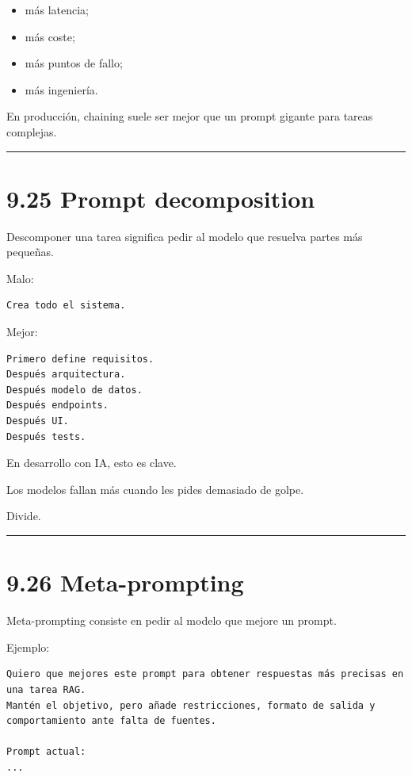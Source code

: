 \begin{itemize}
\tightlist
\item
  más latencia;
\item
  más coste;
\item
  más puntos de fallo;
\item
  más ingeniería.
\end{itemize}

En producción, chaining suele ser mejor que un prompt gigante para
tareas complejas.

\begin{center}\rule{0.5\linewidth}{0.5pt}\end{center}

\section{9.25 Prompt decomposition}\label{prompt-decomposition}

Descomponer una tarea significa pedir al modelo que resuelva partes más
pequeñas.

Malo:

\begin{lstlisting}
Crea todo el sistema.
\end{lstlisting}

Mejor:

\begin{lstlisting}
Primero define requisitos.
Después arquitectura.
Después modelo de datos.
Después endpoints.
Después UI.
Después tests.
\end{lstlisting}

En desarrollo con IA, esto es clave.

Los modelos fallan más cuando les pides demasiado de golpe.

Divide.

\begin{center}\rule{0.5\linewidth}{0.5pt}\end{center}

\section{9.26 Meta-prompting}\label{meta-prompting}

Meta-prompting consiste en pedir al modelo que mejore un prompt.

Ejemplo:

\begin{lstlisting}
Quiero que mejores este prompt para obtener respuestas más precisas en una tarea RAG.
Mantén el objetivo, pero añade restricciones, formato de salida y comportamiento ante falta de fuentes.

Prompt actual:
...
\end{lstlisting}

